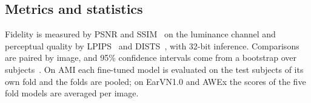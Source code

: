 \subsection{Metrics and statistics}
Fidelity is measured by PSNR and SSIM~\cite{wang2004ssim} on the luminance channel and perceptual quality by LPIPS~\cite{zhang2018lpips} and DISTS~\cite{ding2020dists}, with 32-bit inference. Comparisons are paired by image, and 95\% confidence intervals come from a bootstrap over subjects~\cite{efron1993bootstrap}. On AMI each fine-tuned model is evaluated on the test subjects of its own fold and the folds are pooled; on EarVN1.0 and AWEx the scores of the five fold models are averaged per image.
